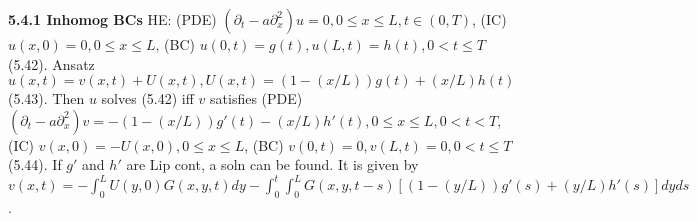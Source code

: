 {\bf 5.4.1 Inhomog BCs} HE: (PDE) $(\partial_t - a \partial_x^2)u=0, 0 \leq x \leq L, t \in (0,T)$, (IC) $u(x,0)= 0, 0 \leq x \leq L$, (BC) $u(0,t)=g(t), u(L,t)=h(t), 0 < t \leq T$ (5.42). Ansatz $u(x,t)= v(x,t) + U(x,t), U(x,t)=(1-(x/L))g(t) + (x/L) h(t)$ (5.43). Then $u$ solves (5.42) iff $v$ satisfies (PDE) $(\partial_t - a \partial_x^2)v=- (1-(x/L))g'(t) - (x/L) h'(t), 0 \leq x \leq L, 0 < t < T$, (IC) $v(x,0)= -U(x,0), 0 \leq x \leq L$, (BC) $v(0,t)=0, v(L,t)=0, 0 < t \leq T$ (5.44). If $g'$ and $h'$ are Lip cont, a soln can be found.  It is given by $v(x,t)=- \int_0^L U(y,0) G(x,y,t) dy - \int_0^t \int_0^L G(x,y,t-s)[(1-(y/L))g'(s)+(y/L) h'(s)]dy ds$.